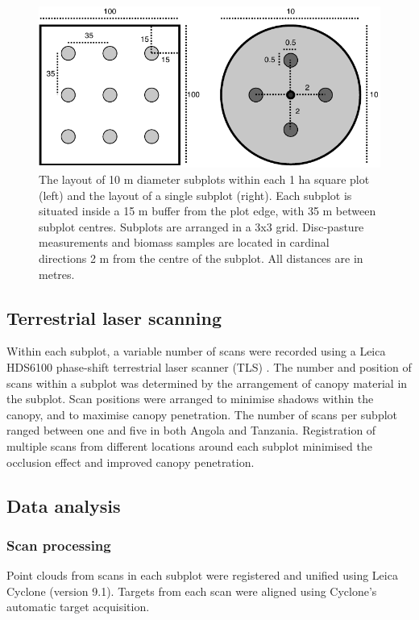 \documentclass[11pt,a4paper]{article}
\begin{document}
\begin{figure}[H]
\centering
	\includegraphics[width=\textwidth]{subplot}
	\caption{The layout of 10 m diameter subplots within each 1 ha square plot (left) and the layout of a single subplot (right). Each subplot is situated inside a 15 m buffer from the plot edge, with 35 m between subplot centres. Subplots are arranged in a 3x3 grid. Disc-pasture measurements and biomass samples are located in cardinal directions 2 m from the centre of the subplot. All distances are in metres.}
	\label{subplot}
\end{figure}

\subsection{Terrestrial laser scanning}

Within each subplot, a variable number of scans were recorded using a Leica HDS6100 phase-shift terrestrial laser scanner (TLS) \citep{Leica}. The number and position of scans within a subplot was determined by the arrangement of canopy material in the subplot. Scan positions were arranged to minimise shadows within the canopy, and to maximise canopy penetration. The number of scans per subplot ranged between one and five in both Angola and Tanzania. Registration of multiple scans from different locations around each subplot minimised the occlusion effect and improved canopy penetration.

\subsection{Data analysis}

\subsubsection{Scan processing}

Point clouds from scans in each subplot were registered and unified using Leica Cyclone (version 9.1). Targets from each scan were aligned using Cyclone's automatic target acquisition. 
\end{document}
